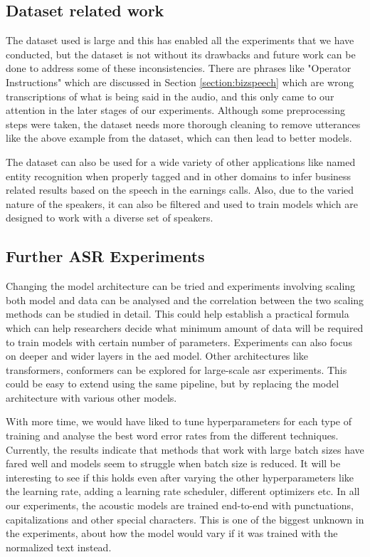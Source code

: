 \subsection{Dataset related work}
The dataset used is large and this has enabled all the experiments that we have conducted, but the dataset is not without its drawbacks and future work can be done to address some of these inconsistencies. There are phrases like "Operator Instructions" which are discussed in Section \ref{section:bizspeech} which are wrong transcriptions of what is being said in the audio, and this only came to our attention in the later stages of our experiments. Although some preprocessing steps were taken, the dataset needs more thorough cleaning to remove utterances like the above example from the dataset, which can then lead to better models.

The dataset can also be used for a wide variety of other applications like named entity recognition when properly tagged and in other domains to infer business related results based on the speech in the earnings calls. Also, due to the varied nature of the speakers, it can also be filtered and used to train models which are designed to work with a diverse set of speakers.  

\subsection{Further ASR Experiments}
Changing the model architecture can be tried and experiments involving scaling both model and data can be analysed and the correlation between the two scaling methods can be studied in detail. This could help establish a practical formula which can help researchers decide what minimum amount of data will be required to train models with certain number of parameters. Experiments can also focus on deeper and wider layers in the \acrshort{aed} model. Other architectures like transformers\cite{Vaswani2017AttentionNeed}, conformers\cite{Gulati2020Conformer:Recognition} can be explored for large-scale \acrshort{asr} experiments. This could be easy to extend using the same pipeline, but by replacing the model architecture with various other models.

With more time, we would have liked to tune hyperparameters for each type of training and analyse the best word error rates from the different techniques. Currently, the results indicate that methods that work with large batch sizes have fared well and models seem to struggle when batch size is reduced. It will be interesting to see if this holds even after varying the other hyperparameters like the learning rate, adding a learning rate scheduler, different optimizers etc. In all our experiments, the acoustic models are trained end-to-end with punctuations, capitalizations and other special characters. This is one of the biggest unknown in the experiments, about how the model would vary if it was trained with the normalized text instead. 

